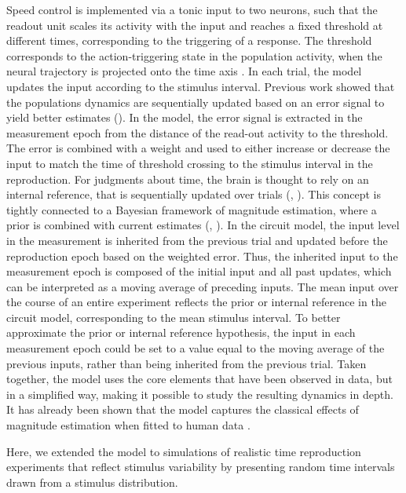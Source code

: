 \documentclass[10pt]{article}
\begin{document}
Speed control is implemented via a tonic input to two neurons, such that the readout unit scales its activity with the input and reaches a fixed threshold at different times, corresponding to the triggering of a response.  
The threshold corresponds to the action-triggering state in the population activity, when the neural trajectory is projected onto the time axis \cite{Remington2018}.
In each trial, the model updates the input according to the stimulus interval.
Previous work showed that the populations dynamics are sequentially updated based on an error signal to yield better estimates (\cite{Egger2019}).
In the model, the error signal is extracted in the measurement epoch from the distance of the read-out activity to the threshold. The error is combined with a weight and used to either increase or decrease the input to match the time of threshold crossing to the stimulus interval in the reproduction.
For judgments about time, the brain is thought to rely on an internal reference, that is sequentially updated over trials (\cite{Bausenhart2014}, \cite{Dyjas2012}). This concept is tightly connected to a Bayesian framework of magnitude estimation, where a prior is combined with current estimates (\cite{Petzschner2015}, \cite{Shi2013}).
In the circuit model, the input level in the measurement is inherited from the previous trial and updated before the reproduction epoch based on the weighted error.
Thus, the inherited input to the measurement epoch is composed of the initial input and all past updates, which can be interpreted as a moving average of preceding inputs. 
The mean input over the course of an entire experiment reflects the prior or internal reference in the circuit model, corresponding to the mean stimulus interval. 
To better approximate the prior or internal reference hypothesis, the input in each measurement epoch could be set to a value equal to the moving average of the previous inputs, rather than being inherited from the previous trial.  
Taken together, the model uses the core elements that have been observed in data, but in a simplified way, making it possible to study the resulting dynamics in depth. 
It has already been shown that the model captures the classical effects of magnitude estimation when fitted to human data \cite{Egger2020}.

Here, we extended the model to simulations of realistic time reproduction experiments that reflect stimulus variability by presenting random time intervals drawn from a stimulus distribution.
\end{document}
